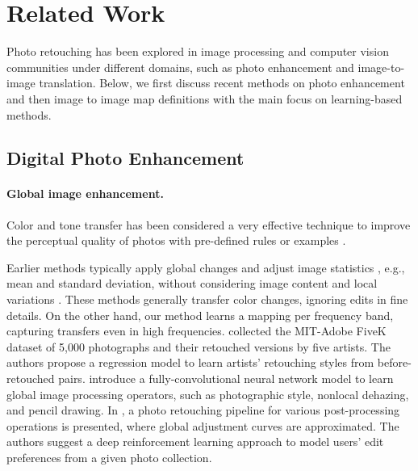 \section{Related Work}

Photo retouching has been explored in image processing and computer vision communities under different domains, such as photo enhancement and image-to-image translation. Below, we first discuss recent methods on photo enhancement and then image to image map definitions with the main focus on learning-based methods.

\subsection{Digital Photo Enhancement}
\paragraph{Global image enhancement.} Color and tone transfer has been considered a very effective technique to improve the perceptual quality of photos with pre-defined rules or examples \cite{Faridul14ASurvey, mustafa2022distilling}. 

Earlier methods typically apply global changes and adjust image statistics \cite{Bychkovsky11Learning, Bae06Two, Pitie05NDimensional,Pitie07Automated,Reinhard01Color,Sunkavalli10Multi, he2020conditional, park2018distort}, e.g., mean and standard deviation, without considering image content and local variations \cite{CohenOr06Color}. These methods generally transfer color changes, ignoring edits in fine details. On the other hand, our method learns a mapping per frequency band, capturing transfers even in high frequencies. \citeauthor{Bychkovsky11Learning} \cite{Bychkovsky11Learning} collected the MIT-Adobe FiveK dataset of 5,000 photographs and their retouched versions by five artists. The authors propose a regression model to learn artists' retouching styles from before-retouched pairs. \citeauthor{chen2017fast} \cite{chen2017fast} introduce a fully-convolutional neural network model to learn global image processing operators, such as photographic style, nonlocal dehazing, and pencil drawing. In \cite{Hu18Exposure}, a photo retouching pipeline for various post-processing operations is presented, where global adjustment curves are approximated. The authors suggest a deep reinforcement learning approach to model users' edit preferences from a given photo collection. 
 

